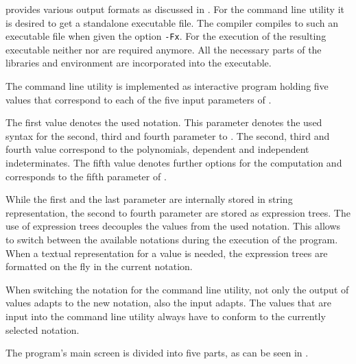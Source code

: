
\Aldor provides various output formats as discussed in . For the command line utility it is desired to get a standalone executable file. The \Aldor compiler compiles to such an executable file when given the option {\tt -Fx}. For the execution of the resulting executable neither \Aldor nor \LibCharSet are required anymore. All the necessary parts of the libraries and \Aldor environment are incorporated into the executable.


The command line utility is implemented as interactive program holding five values that correspond to each of the five input parameters of \exportedsymbol. 

The first value denotes the used notation. This parameter denotes the used syntax for the second, third and fourth parameter to \exportedsymbol. The second, third and fourth value correspond to the polynomials, dependent and independent indeterminates. The fifth value denotes further options for the computation and corresponds to the fifth parameter of \exportedsymbol.

While the first and the last parameter are internally stored in string representation, the second to fourth parameter are stored as expression trees. The use of expression trees decouples the values from the used notation. This allows to switch between the available notations during the execution of the program. When a textual representation for a value is needed, the expression trees are formatted on the fly in the current notation.


When switching the notation for the command line utility, not only the output of values adapts to the new notation, also the input adapts. The values that are input into the command line utility always have to conform to the currently selected notation.


The program's main screen is divided into five parts, as can be seen in . 



